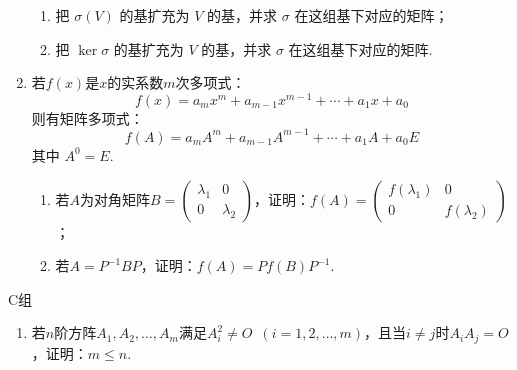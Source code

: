 \begin{enumerate}
\begin{enumerate}
              \item 把 $\sigma(V)$ 的基扩充为 $V$ 的基，并求 $\sigma$ 在这组基下对应的矩阵；

              \item 把 $\ker \sigma$ 的基扩充为 $V$ 的基，并求 $\sigma$ 在这组基下对应的矩阵.
          \end{enumerate}

    \item 若$f(x)$是$x$的实系数$m$次多项式：
          \[f(x)=a_mx^m+a_{m-1}x^{m-1}+\cdots+a_1x+a_0\]
          则有矩阵多项式：
          \[f(A)=a_mA^m+a_{m-1}A^{m-1}+\cdots+a_1A+a_0E\]
          其中 $A^0=E$.
          \begin{enumerate}
              \item 若$A$为对角矩阵$B=\begin{pmatrix}
                            \lambda_1 & 0 \\ 0 & \lambda_2
                        \end{pmatrix}$，证明：$f(A)=\begin{pmatrix}
                            f(\lambda_1) & 0 \\ 0 & f(\lambda_2)
                        \end{pmatrix}$；

              \item 若$A=P^{-1}BP$，证明：$f(A)=Pf(B)P^{-1}$.
          \end{enumerate}
\end{enumerate}

\centerline{\heiti C组}
\begin{enumerate}
    \item 若$n$阶方阵$A_1,A_2,\ldots,A_m$满足$A_i^2\neq O\enspace(i=1,2,\ldots,m)$，且当$i\neq j$时$A_iA_j=O$，证明：$m\leqslant n$.
\end{enumerate}
